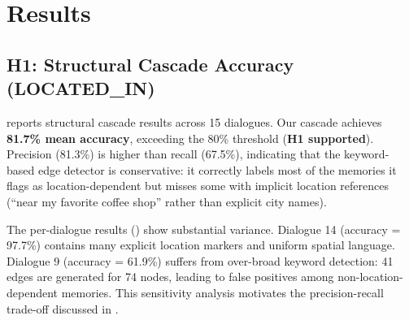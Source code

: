 \section{Results}
\label{sec:results}

\subsection{H1: Structural Cascade Accuracy (LOCATED\_IN)}
\label{sec:results:structural}

 reports structural cascade results across 15 \locomo dialogues. Our cascade achieves \textbf{81.7\% mean accuracy}, exceeding the 80\% threshold (\textbf{H1 supported}). Precision (81.3\%) is higher than recall (67.5\%), indicating that the keyword-based \locatedin edge detector is conservative: it correctly labels most of the memories it flags as location-dependent but misses some with implicit location references (\eg ``near my favorite coffee shop'' rather than explicit city names).

The per-dialogue results () show substantial variance. Dialogue 14 (accuracy = 97.7\%) contains many explicit location markers and uniform spatial language. Dialogue 9 (accuracy = 61.9\%) suffers from over-broad keyword detection: 41 \locatedin edges are generated for 74 nodes, leading to false positives among non-location-dependent memories. This sensitivity analysis motivates the precision-recall trade-off discussed in .

\begin{table}[t]
\centering
\caption{Structural cascade results across 15 \locomo dialogues. Our cascade achieves 81.7\% mean accuracy on location-shift invalidation, exceeding the 80\% target. Recall (67.5\%) is lower than precision (81.3\%) due to implicit location references. Best per-metric results in \textbf{bold}.}
\label{tab:structural}
\end{table}

